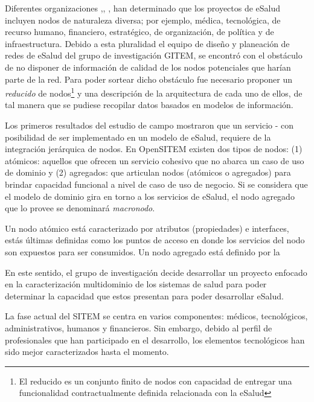 Diferentes organizaciones \cite{ops2011},\cite{oms2016}, \cite{ituoms2012}, han determinado que los proyectos de eSalud incluyen nodos de naturaleza diversa; por ejemplo, médica, tecnológica, de recurso humano, financiero, estratégico, de organización, de política y de infraestructura. Debido a esta pluralidad el equipo de diseño y planeación de redes de eSalud del grupo de investigación GITEM, se encontró con el obstáculo de no disponer de información de calidad de los nodos potenciales que harían parte de la red. Para poder sortear dicho obstáculo fue necesario proponer un \textit{reducido} de nodos\footnote{El reducido es un conjunto finito de nodos con capacidad de entregar una funcionalidad contractualmente definida relacionada con la eSalud} y una descripción de la arquitectura de cada uno de ellos, de tal manera que se pudiese recopilar datos basados en modelos de información.

Los primeros resultados del estudio de campo mostraron que un servicio - con posibilidad de ser implementado en un modelo de eSalud, requiere de la integración jerárquica de nodos. En OpenSITEM existen dos tipos de nodos: (1) atómicos: aquellos que ofrecen un servicio cohesivo que no abarca un caso de uso de dominio  y (2) agregados: que articulan nodos (atómicos o agregados) para brindar capacidad funcional a nivel de caso de uso de negocio. Si se considera que el modelo de dominio gira en torno a los servicios de eSalud, el nodo agregado que lo provee se denominará \textit{macronodo}.

Un nodo atómico está caracterizado por atributos (propiedades) e interfaces, estás últimas definidas como los puntos de acceso en donde los servicios del nodo son expuestos para ser consumidos\cite{theopengroup2016}. Un nodo agregado está definido por la 










En este sentido, el grupo de investigación decide desarrollar un proyecto enfocado en la caracterización multidominio de los sistemas de salud para poder determinar la capacidad que estos presentan para poder desarrollar eSalud. 

La fase actual del SITEM se centra en varios componentes: médicos, tecnológicos, administrativos, humanos y financieros. Sin embargo, debido al perfil de profesionales que han participado en el desarrollo, los elementos tecnológicos han sido mejor caracterizados hasta el momento.

